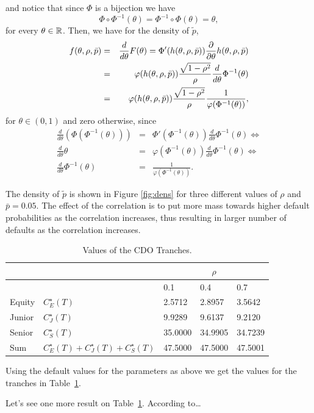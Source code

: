 and notice that since $\Phi$ is a bijection we have
\[\Phi \circ \Phi^{-1}(\theta) = \Phi^{-1} \circ \Phi(\theta) =
\theta, \] for every $\theta \in \mathbb{R}$. Then, we have for the density
of $\tilde{p}$,
\begin{eqnarray}
f(\theta, \rho, \bar{p}) &=& \frac{d}{d \theta} F(\theta) =
\Phi'(h(\theta, \rho, \bar{p})) \frac{\partial}{\partial \theta} h(\theta,
\rho, \bar{p}) \nonumber \\
&=& \varphi(h(\theta, \rho, \bar{p})) \frac{\sqrt{1 -
\rho^2}}{\rho} \frac{d}{d \theta} \Phi^{-1}(\theta) \nonumber \\
&=& \varphi(h(\theta, \rho, \bar{p})) \frac{\sqrt{1 - \rho^2}}{\rho}
\frac{1}{\varphi (\Phi^{-1}(\theta))}, \label{density}
\end{eqnarray}
for $\theta \in (0,1)$ and zero otherwise, since
\begin{eqnarray*}
\frac{d}{d \theta} \left(\Phi (\Phi^{-1}(\theta)) \right) &=&
\Phi'(\Phi^{-1}(\theta)) \frac{d}{d \theta} \Phi^{-1}(\theta)
\Leftrightarrow \\
\frac{d}{d \theta} \theta &=& \varphi(\Phi^{-1}(\theta))
\frac{d}{d \theta} \Phi^{-1}(\theta) \Leftrightarrow \\
\frac{d}{d \theta} \Phi^{-1}(\theta) &=&
\frac{1}{\varphi(\Phi^{-1}(\theta))}.
\end{eqnarray*}



The density of $\tilde{p}$ is shown in Figure \ref{fig:dens} for
three different values of $\rho$ and $\bar{p} = 0.05$. The effect of
the correlation is to put more mass towards higher default
probabilities as the correlation increases, thus resulting in larger
number of defaults as the correlation increases.

\begin{table}[htbp]
\caption{Values of the CDO Tranches.} \label{tab:cdo}
\begin{center}
\begin{tabular}{lllll}
\hline \hline
&            &             \multicolumn{ 3}{c}{$\rho$} \\
\hline
&            &       0.1 &        0.4 &        0.7 \\
\hline Equity &        $C_E^\star(T)$ &     2.5712 &     2.8957 &
3.5642 \\
Junior &        $C_J^\star(T)$ &     9.9289 &     9.6137 &
9.2120 \\
Senior &        $C_S^\star(T)$ &    35.0000 &    34.9905 &
34.7239 \\
\hline Sum & $C_E^\star(T) + C_J^\star(T) + C_S^\star(T)$ & 47.5000&
47.5000 &  47.5001 \\
\hline \hline
\end{tabular}
\end{center}
\end{table}
Using the default values for the parameters as above we get the
values for the tranches in Table~\ref{tab:cdo}.

Let's see one more result on Table~\ref{tab:cdo}. According to\ldots
